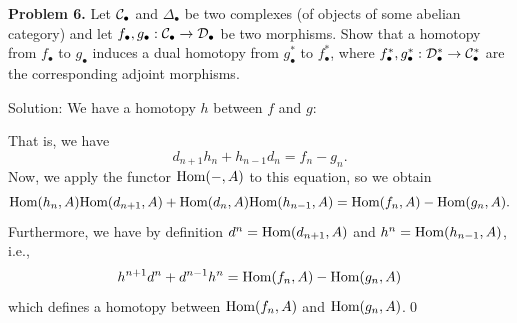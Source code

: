 \begin{dang}
\textbf{Problem 6.} Let \(\mathcal{C}_{\bullet}\) and \(\Delta_{\bullet}\) be two complexes (of objects of some abelian category) and let \(f_{\bullet},g_{\bullet}:\mathcal{C}_{\bullet}\to \mathcal{D}_{\bullet}\) be two morphisms. Show that a homotopy from \(f_{\bullet}\) to \(g_{\bullet}\) induces a dual homotopy from \(g_{\bullet}^{*}\) to \(f_{\bullet}^{*}\), where \(f_{\bullet}^{*},g_{\bullet}^{*}:\mathcal{D}_{\bullet}^{*}\to \mathcal{C}_{\bullet}^{*}\) are the corresponding adjoint morphisms.
\end{dang}
Solution: We have a homotopy $h$ between $f$ and $g$:
\begin{center}
\end{center}
That is, we have 
\begin{equation}
    d_{n+1}h_n+ h_{n-1}d_n = f_n - g_n.
\end{equation}
Now, we apply the functor $\text{Hom}(-,A)$ to this equation, so we obtain 
\begin{equation}
    \text{Hom}(h_n,A)\text{Hom}(d_{n+1},A)+\text{Hom}(d_n,A)\text{Hom}(h_{n-1},A) = \text{Hom}(f_n,A)-\text{Hom}(g_n,A).
\end{equation}
Furthermore, we have by definition $d^n = \text{Hom}(d_{n+1},A)$ and $h^n=\text{Hom}(h_{n-1},A)$, i.e., 
\begin{equation}
    h^{n+1}d^n + d^{n-1}h^n = \text{Hom}(f_n,A)-\text{Hom}(g_n,A)
\end{equation}
which defines a homotopy between $\text{Hom}(f_n,A)$ and $\text{Hom}(g_n,A)$.\qed


